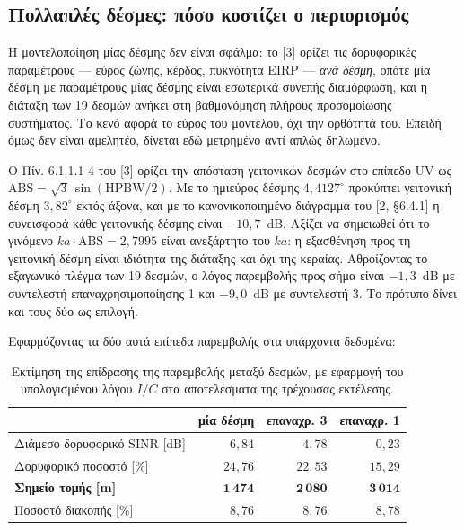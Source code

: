 \documentclass[11pt,a4paper]{article}
\begin{document}
\subsection{Πολλαπλές δέσμες: πόσο κοστίζει ο περιορισμός}
\label{sec:multibeam}

Η μοντελοποίηση μίας δέσμης δεν είναι σφάλμα: το [3] ορίζει τις δορυφορικές
παραμέτρους — εύρος ζώνης, κέρδος, πυκνότητα EIRP — \emph{ανά δέσμη}, οπότε
μία δέσμη με παραμέτρους μίας δέσμης είναι εσωτερικά συνεπής διαμόρφωση, και η
διάταξη των 19 δεσμών ανήκει στη βαθμονόμηση πλήρους προσομοίωσης συστήματος.
Το κενό αφορά το εύρος του μοντέλου, όχι την ορθότητά του. Επειδή όμως δεν
είναι αμελητέο, δίνεται εδώ μετρημένο αντί απλώς δηλωμένο.

Ο Πίν. 6.1.1.1-4 του [3] ορίζει την απόσταση γειτονικών δεσμών στο επίπεδο UV
ως $\mathrm{ABS} = \sqrt{3}\,\sin(\mathrm{HPBW}/2)$. Με το ημιεύρος δέσμης
$4{,}4127^\circ$ προκύπτει γειτονική δέσμη $3{,}82^\circ$ εκτός άξονα, και με
το κανονικοποιημένο διάγραμμα του [2, §6.4.1] η συνεισφορά κάθε γειτονικής
δέσμης είναι $-10{,}7$~dB. Αξίζει να σημειωθεί ότι το γινόμενο
$ka \cdot \mathrm{ABS} = 2{,}7995$ είναι ανεξάρτητο του $ka$: η εξασθένηση
προς τη γειτονική δέσμη είναι ιδιότητα της διάταξης και όχι της κεραίας.
Αθροίζοντας το εξαγωνικό πλέγμα των 19 δεσμών, ο λόγος παρεμβολής προς σήμα
είναι $-1{,}3$~dB με συντελεστή επαναχρησιμοποίησης 1 και $-9{,}0$~dB με
συντελεστή 3. Το πρότυπο δίνει και τους δύο ως επιλογή.

Εφαρμόζοντας τα δύο αυτά επίπεδα παρεμβολής στα υπάρχοντα δεδομένα:

\begin{table}[htbp]
\centering\small
\caption{Εκτίμηση της επίδρασης της παρεμβολής μεταξύ δεσμών, με εφαρμογή του
υπολογισμένου λόγου $I/C$ στα αποτελέσματα της τρέχουσας εκτέλεσης.}
\label{tab:multibeam}
\begin{tabular}{@{}lrrr@{}}
\toprule
 & μία δέσμη & επαναχρ. 3 & επαναχρ. 1 \\
\midrule
Διάμεσο δορυφορικό SINR [dB] & $6{,}84$ & $4{,}78$ & $0{,}23$ \\
Δορυφορικό ποσοστό [\%]      & $24{,}76$ & $22{,}53$ & $15{,}29$ \\
\textbf{Σημείο τομής [m]}    & $\mathbf{1\,474}$ & $\mathbf{2\,080}$ & $\mathbf{3\,014}$ \\
Ποσοστό διακοπής [\%]        & $8{,}76$ & $8{,}76$ & $8{,}78$ \\
\bottomrule
\end{tabular}
\end{table}
\end{document}
